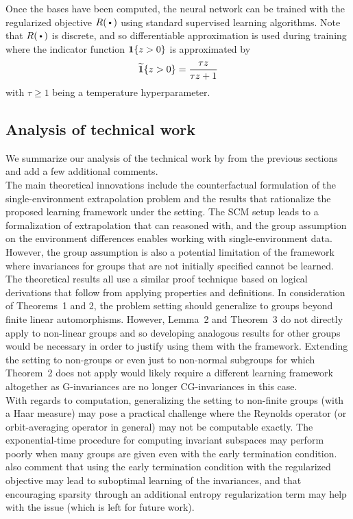 Once the bases have been computed, the neural network can be trained with the regularized objective $R(\argdot)$ using standard supervised learning algorithms. Note that $R(\argdot)$ is discrete, and so differentiable approximation is used during training where the indicator function $\mathbf{1}\{z>0\}$ is approximated by
\[
\widetilde{\mathbf{1}}\{z>0\} = \frac{\tau z}{\tau z+1}
\]
with $\tau\geq1$ being a temperature hyperparameter.


\subsection{Analysis of technical work}

We summarize our analysis of the technical work by \textcite{Mouli:2021} from the previous sections and add a few additional comments.
\\

The main theoretical innovations include the counterfactual formulation of the single-environment extrapolation problem and the results that rationalize the proposed learning framework under the setting. The SCM setup leads to a formalization of extrapolation that can reasoned with, and the group assumption on the environment differences enables working with single-environment data. However, the group assumption is also a potential limitation of the framework where invariances for groups that are not initially specified cannot be learned.
\\

The theoretical results all use a similar proof technique based on logical derivations that follow from applying properties and definitions. In consideration of Theorems~1 and 2, the problem setting should generalize to groups beyond finite linear automorphisms. However, Lemma~2 and Theorem~3 do not directly apply to non-linear groups and so developing analogous results for other groups would be necessary in order to justify using them with the framework. Extending the setting to non-groups or even just to non-normal subgroups for which Theorem~2 does not apply would likely require a different learning framework altogether as G-invariances are no longer CG-invariances in this case.
\\

With regards to computation, generalizing the setting to non-finite groups (with a Haar measure) may pose a practical challenge where the Reynolds operator (or orbit-averaging operator in general) may not be computable exactly. The exponential-time procedure for computing invariant subspaces may perform poorly when many groups are given even with the early termination condition. \textcite{Mouli:2021} also comment that using the early termination condition with the regularized objective may lead to suboptimal learning of the invariances, and that encouraging sparsity through an additional entropy regularization term may help with the issue (which is left for future work).

